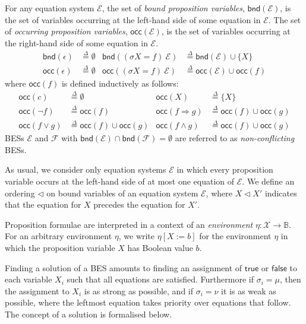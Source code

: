 \documentclass[a4paper,11pt]{article}
\newcommand{\tle}{\ensuremath{\triangleleft}}
\newcommand{\isdef}{\ensuremath{\stackrel{\Delta}{=}}}
\newcommand{\ap}{{:}}
\newcommand{\mc}[1]{\ensuremath{\mathcal{#1}}}
\newcommand{\bool}{\ensuremath{\mathbb{B}}}   %
\newcommand{\true}{\ensuremath{\mathsf{true}}}
\newcommand{\false}{\ensuremath{\mathsf{false}}}
\newcommand{\bnd}[1]{\ensuremath{\mathsf{bnd}(#1)}}
\newcommand{\occ}[1]{\ensuremath{\mathsf{occ}(#1)}}
\newcommand{\imp}{\ensuremath{\Rightarrow}}
\begin{document}
%
For any equation system $\mc{E}$, the set of \emph{bound proposition variables},
$\bnd{\mc{E}}$, is the set of variables occurring at the left-hand side of
some equation in $\mc{E}$. The set of \emph{occurring proposition variables},
$\occ{\mc{E}}$, is the set of variables occurring at the right-hand side of
some equation in $\mc{E}$. 
\begin{align*}
\bnd{\epsilon} & \isdef \emptyset &
\bnd{(\sigma X = f)~\mc{E}} & \isdef \bnd{\mc{E}} \cup \{X\}\\
  \occ{\epsilon} & \isdef \emptyset &
  \occ{(\sigma X = f)~\mc{E}} & \isdef \occ{\mc{E}} \cup \occ{f} 
\end{align*}
%
where $\occ{f}$ is defined inductively as follows:
\begin{align*}
  \occ{c} & \isdef \emptyset  & \occ{X}     & \isdef \{X\}   \\
  \occ{\neg f} & \isdef \occ{f} &
  \occ{f \imp g} & \isdef \occ{f} \cup \occ{g} \\
  \occ{f \vee g} & \isdef \occ{f} \cup \occ{g} & 
  \occ{f \wedge g} & \isdef \occ{f} \cup \occ{g} 
\end{align*}
%
BESs $\mc{E}$ and $\mc{F}$ with $\bnd{\mc{E}} \cap \bnd{\mc{F}} = \emptyset$
are referred to as \emph{non-conflicting} BESs.

As usual, we consider only equation systems $\mc{E}$ in which
every proposition variable occurs at the left-hand side of at most one
equation of $\mc{E}$. We define an ordering $\tle$
on bound variables of an equation system $\mc{E}$, where $X \tle X'$
indicates that the equation for $X$ precedes the equation for $X'$.

Proposition formulae are interpreted in a context of an
\emph{environment} $\eta \ap \mc{X} \to \bool$. For an
arbitrary environment $\eta$, we write $\eta [X:=b]$ for the environment
$\eta$ in which the proposition variable $X$ has
Boolean value $b$.
%

Finding a solution of a BES amounts to finding an assignment of $\true$ or
$\false$ to each variable $X_i$ such that all equations are satisfied.
Furthermore if $\sigma_i = \mu$, then the assignment to $X_i$ is as strong as
possible, and if $\sigma_i = \nu$ it is as weak as possible, where the
leftmost equation takes priority over equations that follow. The concept
of a solution is formalised below.
\end{document}
